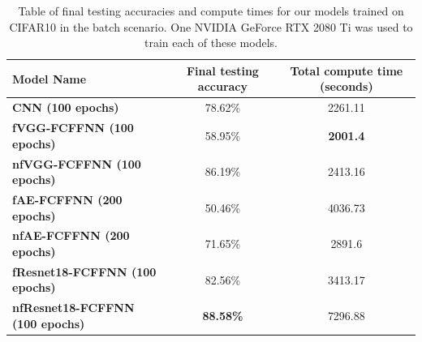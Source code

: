 \begin{table}[ht]
    \centering
    \begin{tabular}{l c c}
    \toprule
    \textbf{Model Name} & \textbf{Final testing accuracy}  & \textbf{Total compute time (seconds)}\\
    \midrule
    \textbf{CNN (100 epochs)} & 78.62\% & 2261.11 \\
    \textbf{fVGG-FCFFNN (100 epochs)} & 58.95\% & \textbf{2001.4}  \\
    \textbf{nfVGG-FCFFNN (100 epochs)} & 86.19\% & 2413.16  \\
    \textbf{fAE-FCFFNN (200 epochs)} & 50.46\% & 4036.73 \\
    \textbf{nfAE-FCFFNN (200 epochs)} & 71.65\% & 2891.6 \\
    \textbf{fResnet18-FCFFNN (100 epochs)} & 82.56\% & 3413.17 \\
    \textbf{nfResnet18-FCFFNN (100 epochs)} & \textbf{88.58\%} & 7296.88 \\
    \bottomrule
    \end{tabular}
    \caption{Table of final testing accuracies and compute times for our models trained on CIFAR10 in the batch scenario. One NVIDIA GeForce RTX 2080 Ti was used to train each of these models.}
    \label{tab:batch_acc_and_compute_times}
\end{table}

